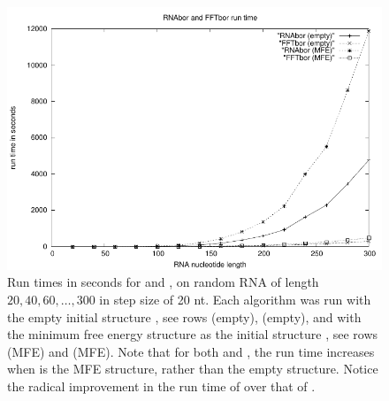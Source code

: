 \begin{figure}[!h]
\centering
\begin{center}
\includegraphics[width=\textwidth]{Figures/FFTbor/benchmarking.pdf}
\end{center}
\caption{Run times in seconds for \rnabor and \fftbor, on random RNA
of length $20,40,60,\dots,300$ in step size of 20 nt. Each algorithm
was run with the empty initial structure \strSt, see rows
\rnabor (empty), \fftbor (empty), and with the minimum free
energy structure as the initial structure \strSt, see rows
\rnabor (MFE) and \fftbor (MFE). Note that for both \rnabor
and \fftbor, the run time increases when \strSt is the MFE structure,
rather than the empty structure. Notice the radical improvement in the
run time of \fftbor over that of \rnabor.
}
\label{fig:fftbor:benchmarking}
\end{figure}
